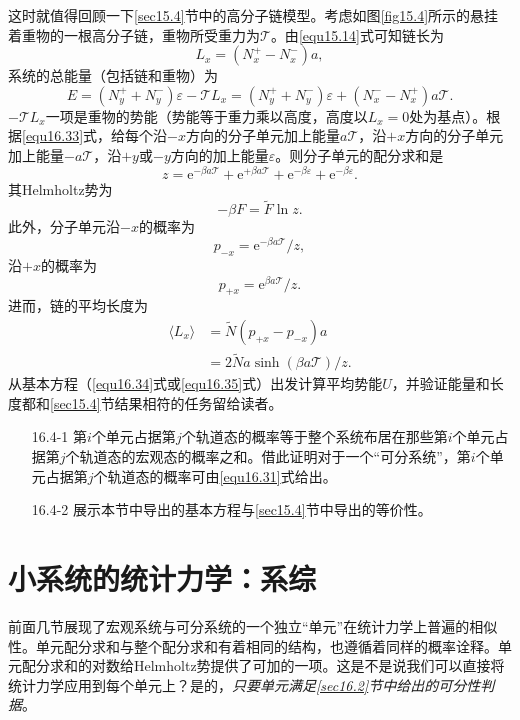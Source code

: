 这时就值得回顾一下\ref{sec15.4}节中的高分子链模型。考虑如图\ref{fig15.4}所示的悬挂着重物的一根高分子链，重物所受重力为$\mathcal T$。由\eqref{equ15.14}式可知链长为
\begin{equation}
L_x = (N_x^+-N_x^-)a,
\end{equation}
系统的总能量（包括链和重物）为
\begin{equation}
E = (N_y^++N_y^-)\varepsilon-\mathcal TL_x = (N_y^++N_y^-)\varepsilon+(N_x^--N_x^+)a\mathcal T.
\label{equ16.33}
\end{equation}
$-\mathcal TL_x$一项是重物的势能（势能等于重力乘以高度，高度以$L_x=0$处为基点）。根据\eqref{equ16.33}式，给每个沿$-x$方向的分子单元加上能量$a\mathcal T$，沿$+x$方向的分子单元加上能量$-a\mathcal T$，沿$+y$或$-y$方向的加上能量$\varepsilon$。则分子单元的配分求和是
\begin{equation}
z = \mathrm e^{-\beta a\mathcal T}+\mathrm e^{+\beta a\mathcal T}+\mathrm e^{-\beta\varepsilon}+\mathrm e^{-\beta\varepsilon}.
\label{equ16.34}
\end{equation}
其Helmholtz势为
\begin{equation}
-\beta F=\tilde F\ln z.
\label{equ16.35}
\end{equation}
此外，分子单元沿$-x$的概率为
\begin{equation}
p_{-x} = \mathrm e^{-\beta a\mathcal T}/z,
\end{equation}
沿$+x$的概率为
\begin{equation}
p_{+x} = \mathrm e^{\beta a\mathcal T}/z.
\end{equation}
进而，链的平均长度为
\begin{align}
\langle L_x\rangle &= \tilde N(p_{+x}-p_{-x})a\\
&= 2\tilde Na\sinh(\beta a\mathcal T)/z.
\end{align}
从基本方程（\eqref{equ16.34}式或\eqref{equ16.35}式）出发计算平均势能$U$，并验证能量和长度都和\ref{sec15.4}节结果相符的任务留给读者。

\begin{itemize}
\item[16.4-1] 第$i$个单元占据第$j$个轨道态的概率等于整个系统布居在那些第$i$个单元占据第$j$个轨道态的宏观态的概率之和。借此证明对于一个“可分系统”，第$i$个单元占据第$j$个轨道态的概率可由\eqref{equ16.31}式给出。
\item[16.4-2] 展示本节中导出的基本方程与\ref{sec15.4}节中导出的等价性。
\end{itemize}
\section{小系统的统计力学：系综}\label{sec16.5}
前面几节展现了宏观系统与可分系统的一个独立“单元”在统计力学上普遍的相似性。单元配分求和与整个配分求和有着相同的结构，也遵循着同样的概率诠释。单元配分求和的对数给Helmholtz势提供了可加的一项。这是不是说我们可以直接将统计力学应用到每个单元上？是的，{\it 只要单元满足\ref{sec16.2}节中给出的可分性判据}。

